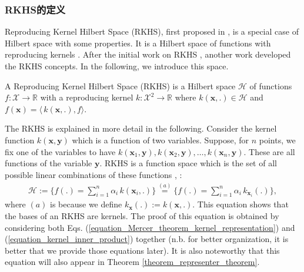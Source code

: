 \documentclass[lang=cn,10pt]{gorgeousnbook}
\numberwithin{equation}{section}%
\numberwithin{figure}{section}%
\begin{document}
\subsubsection{RKHS的定义}

Reproducing Kernel Hilbert Space (RKHS), first proposed in \cite{aronszajn1950theory}, is a special case of Hilbert space with some properties. It is a Hilbert space of functions with reproducing kernels \cite{berlinet2011reproducing}. 
After the initial work on RKHS \cite{aronszajn1950theory}, another work \cite{aizerman1964theoretical} developed the RKHS concepts.
In the following, we introduce this space. 

\begin{definition}\label{definition_RKHS}
A Reproducing Kernel Hilbert Space (RKHS) is a Hilbert space $\mathcal{H}$ of functions $f: \mathcal{X} \rightarrow \mathbb{R}$ with a reproducing kernel $k: \mathcal{X}^2 \rightarrow \mathbb{R}$ where $k(\boldsymbol{x}, .) \in \mathcal{H}$ and $f(\boldsymbol{x}) = \langle\,k(\boldsymbol{x},.),f\rangle$. 
\end{definition}

The RKHS is explained in more detail in the following. 
Consider the kernel function $k(\boldsymbol{x}, \boldsymbol{y})$ which is a function of two variables. 
Suppose, for $n$ points, we fix one of the variables to have $k(\boldsymbol{x}_1, \boldsymbol{y}), k(\boldsymbol{x}_2, \boldsymbol{y}), \dots, k(\boldsymbol{x}_n, \boldsymbol{y})$.
These are all functions of the variable $\boldsymbol{y}$. 
RKHS is a function space which is the set of all possible linear combinations of these functions \cite{kimeldorf1971some}, \cite{mercer1909functions}:
\begin{align}\label{equation_RKHS}
\mathcal{H} :=\! \Big\{f(.) = \sum_{i=1}^n \alpha_i\, k(\boldsymbol{x}_i, .)\Big\} \!\overset{(a)}{=}\! \Big\{f(.) = \sum_{i=1}^n \alpha_i\, k_{\boldsymbol{x}_i}(.)\Big\},
\end{align}
where $(a)$ is because we define $k_{\boldsymbol{x}}(.) := k(\boldsymbol{x}, .)$.
This equation shows that the bases of an RKHS are kernels.
The proof of this equation is obtained by considering both Eqs. (\ref{equation_Mercer_theorem_kernel_representation}) and (\ref{equation_kernel_inner_product}) together (n.b. for better organization, it is better that we provide those equations later). 
It is also noteworthy that this equation will also appear in Theorem \ref{theorem_representer_theorem}.
\end{document}
